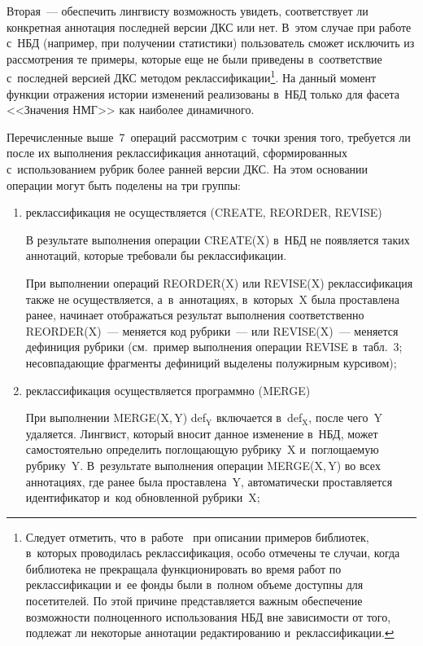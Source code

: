 \begin{multicols}{2}
Вторая~--- обеспечить лингвисту возможность увидеть, 
соответствует ли конкретная аннотация последней версии ДКС или нет. В~этом 
случае при работе с~НБД (например, при получении статистики) пользователь 
сможет исключить из рассмотрения те примеры, которые еще не были 
приведены в~соответствие с~последней версией ДКС методом 
реклассификации\footnote{Следует отметить, что в~работе~\cite{17-gon} при описании примеров 
библиотек, в~которых проводилась реклассификация, особо отмечены те случаи, когда библиотека не 
прекращала функционировать во время работ по реклассификации и~ее фонды были в~полном объеме 
доступны для посетителей. По этой причине представляется важным обеспечение возможности полноценного 
использования НБД вне зависимости от того, подлежат ли некоторые аннотации редактированию 
и~реклассификации.}. На данный момент функции отражения истории изменений 
реализованы в~НБД только для фасета <<Значения НМГ>> как наиболее 
динамичного.

     Перечисленные выше~7~операций рассмотрим с~точки зрения того, 
требуется ли после их выполнения реклассификация аннотаций, 
сформированных с~использованием рубрик более ранней версии ДКС. На этом 
основании операции могут быть поделены на три группы: 
\begin{enumerate}[(1)]
\item  реклассификация не осуществляется \mbox{(CREATE,}
REORDER, REVISE)

     В результате выполнения операции CREATE(X) в~НБД не появляется 
таких аннотаций, которые требовали бы реклассификации.
     
     При выполнении операций REORDER(X) или REVISE(X) 
реклассификация также не осуществляется, а~в~аннотациях, в~которых~X 
была проставлена ранее, начинает отображаться результат выполнения 
соответственно \mbox{REORDER(X)}~--- меняется код рубрики~--- или  
REVISE(X)~--- меняется дефиниция рубрики (см.\ пример выполнения 
операции REVISE в~табл.~3; несовпадающие фрагменты дефиниций выделены 
полужирным курсивом);
     
\item  реклассификация осуществляется программно 
(MERGE)

     При выполнении MERGE(X,\,Y) def$_{\mathrm{Y}}$ включается 
в~def$_{\mathrm{X}}$, после чего~Y удаляется. Лингвист, который вносит 
данное изменение в~НБД, может самостоятельно определить поглощающую 
рубрику~X и~поглощаемую рубрику~Y. В~результате выполнения операции 
MERGE(X,\,Y) во всех аннотациях, где ранее была проставлена~Y, 
автоматически проставляется идентификатор и~код обновленной рубрики~X;


\end{enumerate}
\end{multicols}
